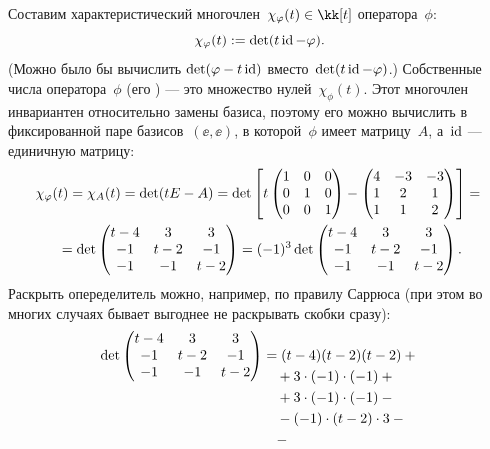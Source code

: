 \begin{solution}
	Составим характеристический многочлен~$\chi_\phi(t) \in \kk[t]$ оператора~$\phi$:
	\[
		\chi_\varphi(t) :=
		\det(t \mathop{\mathrm{id}}\nolimits - \varphi)
		.
	\]
	(Можно было бы вычислить $\det(\varphi - t\mathop{\mathrm{id}}\nolimits)$ вместо~$\det(t\mathop{\mathrm{id}}\nolimits - \varphi)$.)
	Собственные числа оператора~$\phi$ (его ) --- это множество нулей~$\chi_\phi(t)$. Этот многочлен инвариантен относительно замены базиса, поэтому его можно вычислить в фиксированной паре базисов~$(\ee, \ee)$, в которой~$\phi$ имеет матрицу~$A$, а~$\mathop{\mathrm{id}}\nolimits$ --- единичную матрицу:
	\begin{multline}
		\chi_\varphi(t) =
		\chi_A(t) =
		\det(tE - A) =
		\det
		\left[ 
			t
			\begin{pmatrix}
				1 & 0 & 0 \\
				0 & 1 & 0 \\
				0 & 0 & 1
			\end{pmatrix}
			-
			\begin{pmatrix}
				4 & -3 & -3 \\
				1 & 2 & 1 \\
				1 & 1 & 2
			\end{pmatrix}
		\right]
		= {} \\ {} =
		\det
		\begin{pmatrix}
			t-4 & 3 & 3 \\
			-1 & t-2 & -1 \\
			-1 & -1 & t-2
		\end{pmatrix}
		=
		(-1)^3
		\det
		\begin{pmatrix}
			t-4 & 3 & 3 \\
			-1 & t-2 & -1 \\
			-1 & -1 & t-2
		\end{pmatrix}
		.
		\label{eq:num5:chi}
	\end{multline}
	Раскрыть опеределитель можно, например, по правилу Саррюса (при этом во многих случаях бывает выгоднее не раскрывать скобки сразу):
	\begin{align*}
		\raisebox{0pt}[2em][0pt]{$
			\displaystyle
			\det
			\begin{pmatrix}
				t-4 & 3 & 3 \\
				-1 & t-2 & -1 \\
				-1 & -1 & t-2
			\end{pmatrix}
		$}
		&=
		(t-4)(t-2)(t-2) +
		{} \\ {} &\quad +
		3 \cdot (-1) \cdot (-1) +
		{} \\ {} &\quad +
		3 \cdot (-1) \cdot (-1) -
		{} \\ {} &\quad -
		(-1) \cdot (t - 2) \cdot 3 -
		{} \\ {} &\quad -

\end{align*}
\end{solution}
